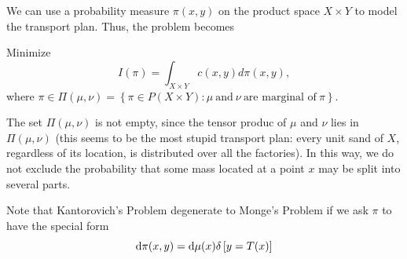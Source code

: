 We can use a probability measure $\pi(x, y)$ on the product space $X \times Y$ to model the transport plan. Thus, the problem becomes 
\begin{problem}\label{pro: Kant}
	Minimize 
	\[
	I(\pi) = \int_{X \times Y} c(x, y) d \pi(x, y) \nonumber,
	\]
	where $\pi \in \Pi(\mu, \nu) = \left\{\pi \in P(X \times Y): \mu \ \text{and} \ \nu \ \text{are marginal of} \ \pi \right\}$.
\end{problem}
\begin{remark}
	The set $\Pi(\mu, \nu)$ is not empty, since the tensor produc of $\mu$ and $\nu$ lies in $\Pi(\mu, \nu)$ (this seems to be the most stupid transport plan: every unit sand of $X$, regardless of its location, is distributed over all the factories). In this way, we do not exclude the probability that some mass located at a point $x$ may be split into several parts. 
\end{remark}
\begin{remark}
	Note that Kantorovich's Problem degenerate to Monge's Problem if we ask $\pi$ to have the special form
	\[
	\mathrm{d}\pi(x, y) = \mathrm{d} \mu(x) \delta\left[y = T(x)\right]
	\]
\end{remark}


